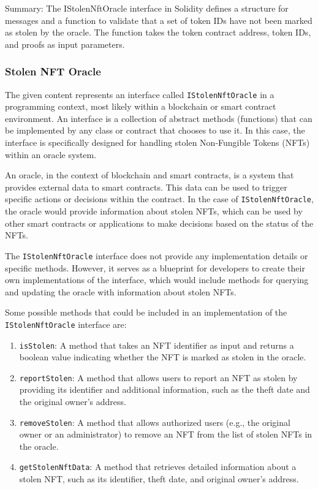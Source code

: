 Summary: The IStolenNftOracle interface in Solidity defines a structure
for messages and a function to validate that a set of token IDs have not
been marked as stolen by the oracle. The function takes the token
contract address, token IDs, and proofs as input parameters.

\hypertarget{stolen-nft-oracle-1}{%
\subsubsection{Stolen NFT Oracle}\label{stolen-nft-oracle-1}}

The given content represents an interface called
\texttt{IStolenNftOracle} in a programming context, most likely within a
blockchain or smart contract environment. An interface is a collection
of abstract methods (functions) that can be implemented by any class or
contract that chooses to use it. In this case, the interface is
specifically designed for handling stolen Non-Fungible Tokens (NFTs)
within an oracle system.

An oracle, in the context of blockchain and smart contracts, is a system
that provides external data to smart contracts. This data can be used to
trigger specific actions or decisions within the contract. In the case
of \texttt{IStolenNftOracle}, the oracle would provide information about
stolen NFTs, which can be used by other smart contracts or applications
to make decisions based on the status of the NFTs.

The \texttt{IStolenNftOracle} interface does not provide any
implementation details or specific methods. However, it serves as a
blueprint for developers to create their own implementations of the
interface, which would include methods for querying and updating the
oracle with information about stolen NFTs.

Some possible methods that could be included in an implementation of the
\texttt{IStolenNftOracle} interface are:

\begin{enumerate}
\def\labelenumi{\arabic{enumi}.}
\item
  \texttt{isStolen}: A method that takes an NFT identifier as input and
  returns a boolean value indicating whether the NFT is marked as stolen
  in the oracle.
\item
  \texttt{reportStolen}: A method that allows users to report an NFT as
  stolen by providing its identifier and additional information, such as
  the theft date and the original owner's address.
\item
  \texttt{removeStolen}: A method that allows authorized users (e.g.,
  the original owner or an administrator) to remove an NFT from the list
  of stolen NFTs in the oracle.
\item
  \texttt{getStolenNftData}: A method that retrieves detailed
  information about a stolen NFT, such as its identifier, theft date,
  and original owner's address.
\end{enumerate}

